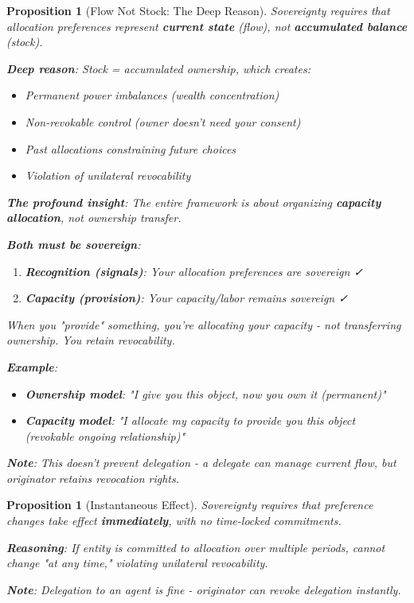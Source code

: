 \documentclass[11pt,a4paper]{article}
\newtheorem{proposition}[theorem]{Proposition}
\theoremstyle{definition}
\theoremstyle{remark}
\begin{document}
\begin{proposition}[Flow Not Stock: The Deep Reason]
Sovereignty requires that allocation preferences represent \textbf{current state} (flow), not \textbf{accumulated balance} (stock).

\textbf{Deep reason}: Stock = accumulated ownership, which creates:
\begin{itemize}
\item Permanent power imbalances (wealth concentration)
\item Non-revokable control (owner doesn't need your consent)
\item Past allocations constraining future choices
\item Violation of unilateral revocability
\end{itemize}

\textbf{The profound insight}: The entire framework is about organizing \textbf{capacity allocation}, not ownership transfer.

\textbf{Both must be sovereign}:
\begin{enumerate}
\item \textbf{Recognition (signals)}: Your allocation preferences are sovereign ✓
\item \textbf{Capacity (provision)}: Your capacity/labor remains sovereign ✓
\end{enumerate}

When you "provide" something, you're allocating your capacity - not transferring ownership. You retain revocability.

\textbf{Example}: 
\begin{itemize}
\item \textbf{Ownership model}: "I give you this object, now you own it (permanent)"
\item \textbf{Capacity model}: "I allocate my capacity to provide you this object (revokable ongoing relationship)"
\end{itemize}

\textbf{Note}: This doesn't prevent delegation - a delegate can manage current flow, but originator retains revocation rights.
\end{proposition}

\begin{proposition}[Instantaneous Effect]
Sovereignty requires that preference changes take effect \textbf{immediately}, with no time-locked commitments.

\textbf{Reasoning}: If entity is committed to allocation over multiple periods, cannot change "at any time," violating unilateral revocability.

\textbf{Note}: Delegation to an agent is fine - originator can revoke delegation instantly.
\end{proposition}
\end{document}
